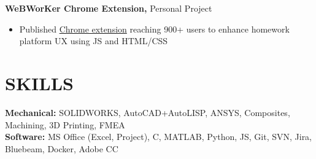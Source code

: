 \documentclass[11pt]{article}       %
\begin{document}
\textbf{WeBWorKer Chrome Extension,} {Personal Project} \\
\vspace{-8.5pt}
\begin{itemize}
  \item Published \href{https://www.danielrbenjamin.com/projects/webworker/}{Chrome extension} reaching 900+ users to enhance homework platform UX using JS and HTML/CSS
\end{itemize}

\section*{SKILLS}
\textbf{Mechanical:} SOLIDWORKS, AutoCAD+AutoLISP, ANSYS, Composites, Machining, 3D Printing, FMEA\\
\textbf{Software:} MS Office (Excel, Project), C, MATLAB, Python, JS, Git, SVN, Jira, Bluebeam, Docker, Adobe CC

\end{document}
